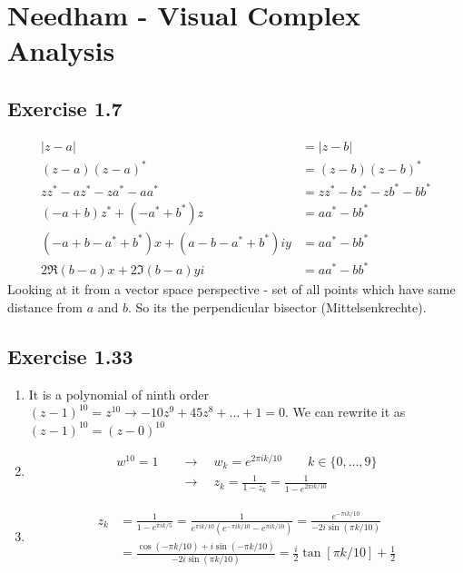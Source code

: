 \documentclass[../main.tex]{subfiles}
\begin{document}
\newpage
\section{{\sc Needham} - Visual Complex Analysis}
\subsection{Exercise 1.7}
\begin{align}
|z-a|&=|z-b|\\
(z-a)(z-a)^*&=(z-b)(z-b)^*\\
zz^*-az^*-za^*-aa^*&=zz^*-bz^*-zb^*-bb^*\\
(-a+b)z^*+(-a^*+b^*)z&=aa^*-bb^*\\
(-a+b-a^*+b^*)x+(a-b-a^*+b^*)iy&=aa^*-bb^*\\
2\Re(b-a)x+2\Im(b-a)yi&=aa^*-bb^*
\end{align}
Looking at it from a vector space perspective - set of all points which have same distance from $a$ and $b$. So its the perpendicular bisector (Mittelsenkrechte).


\subsection{Exercise 1.33}
\begin{enumerate}
\item It is a polynomial of ninth order 
$(z-1)^{10}=z^{10}\rightarrow -10z^9+45z^8+...+1=0$.
We can rewrite it as $(z-1)^{10}=(z-0)^{10}$
\item 
\begin{align}
w^{10}=1\quad
&\rightarrow\quad w_k=e^{2\pi ik/10}\qquad k\in\{0,...,9\}\\
&\rightarrow\quad z_k=\frac{1}{1-z_k}=\frac{1}{1-e^{2\pi ik/10}}
\end{align}

\item 
\begin{align}
z_k&=\frac{1}{1-e^{\pi ik/5}}
=\frac{1}{e^{\pi ik/10}(e^{-\pi ik/10}-e^{\pi ik/10})}
=\frac{e^{-\pi ik/10}}{-2i\sin(\pi k/10)}\\
&=\frac{\cos(-\pi k/10)+i\sin(-\pi k/10)}{-2i\sin(\pi k/10)}
=\frac{i}{2}\tan[\pi k/10]+\frac{1}{2}
\end{align}

\end{enumerate}
\end{document}
